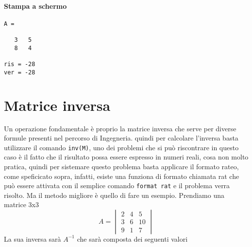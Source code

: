 
\paragraph{Stampa a schermo}

\begin{verbatim}
A =

   3   5
   8   4

ris = -28
ver = -28
\end{verbatim}

\section{Matrice inversa}
\label{sec:mtxInv}
Un operazione fondamentale è proprio la matrice inversa che serve per diverse
formule presenti nel percorso di Ingegneria. quindi per calcolare l'inversa basta utilizzare il comando \lstinline|inv(M)|, uno dei problemi che si può
riscontrare in questo caso è il fatto che il risultato possa essere espresso in
numeri reali, cosa non molto pratica, quindi per sistemare questo problema
basta applicare il formato rateo, come speficicato sopra, infatti, esiste
una funziona di formato chiamata rat che può essere attivata con il semplice
comando \lstinline|format rat| e il problema verra risolto.
Ma il metodo migliore è quello di fare un esempio. Prendiamo una matrice 3x3
\begin{equation}
  \label{eq:es3}
  A=\begin{vmatrix}
    2  & 4 & 5\\
    3  & 6 & 10\\
    9  & 1 & 7
  \end{vmatrix}
\end{equation}
La sua inversa sarà $A^{-1}$ che sarà composta dei seguenti valori

